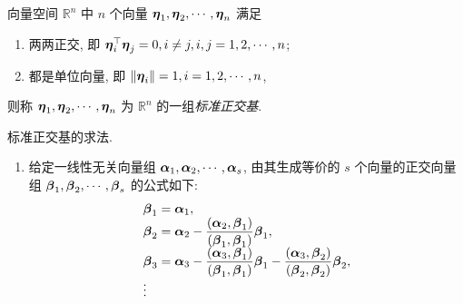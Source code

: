 \begin{definition}
    向量空间 $ \mathbb{R}^{n} $ 中 $ n $ 个向量 $ \vb*{\eta}_{1}, \vb*{\eta}_{2}, \cdots, \vb*{\eta}_{n} $ 满足
    \begin{enumerate}[label=(\arabic{*})]
        \item 两两正交, 即 $ \vb*{\eta}_{i}^{\top} \vb*{\eta}_{j}=0, i \neq j, i, j=1,2, \cdots, n $;
        \item 都是单位向量, 即 $ \left\|\vb*{\eta}_{i}\right\|=1, i=1,2, \cdots, n $,
    \end{enumerate}
    则称 $ \vb*{\eta}_{1}, \vb*{\eta}_{2}, \cdots, \vb*{\eta}_{n} $ 为 $ \mathbb{R}^{n} $ 的一组\textit{标准正交基}.
\end{definition}

\begin{theorem}
    标准正交基的求法.
    \begin{enumerate}[label=(\arabic{*})]
        \item  给定一线性无关向量组 $ \vb*{\alpha}_{1}, \vb*{\alpha}_{2}, \cdots, \vb*{\alpha}_{s} $, 由其生成等价的 $ s$ 个向量的正交向量组 $ \vb*{\beta}_{1}, \vb*{\beta}_{2}, \cdots, \vb*{\beta}_{s} $ 的公式如下:
              $$\begin{array}{l}
                      \vb*{\beta}_{1}=\vb*{\alpha}_{1},                                                                                                                                                                                                                                             \\
                      \vb*{\beta}_{2}=\vb*{\alpha}_{2}-\dfrac{\left(\vb*{\alpha}_{2}, \vb*{\beta}_{1}\right)}{\left(\vb*{\beta}_{1}, \vb*{\beta}_{1}\right)} \vb*{\beta}_{1},                                                                                                                       \\
                      \vb*{\beta}_{3}=\vb*{\alpha}_{3}-\dfrac{\left(\vb*{\alpha}_{3}, \vb*{\beta}_{1}\right)}{\left(\vb*{\beta}_{1}, \vb*{\beta}_{1}\right)} \vb*{\beta}_{1}-\dfrac{\left(\vb*{\alpha}_{3}, \vb*{\beta}_{2}\right)}{\left(\vb*{\beta}_{2}, \vb*{\beta}_{2}\right)} \vb*{\beta}_{2}, \\
                      \vdots                                                                                                                                                                                                                                                                        \\

\end{array}$$
\end{enumerate}
\end{theorem}

